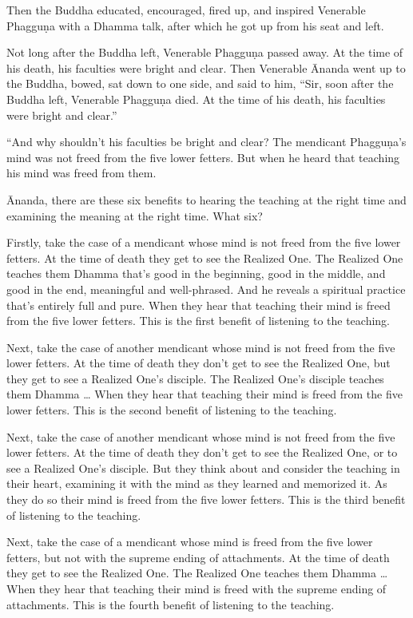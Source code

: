 \documentclass[12pt,openany]{book}%
\begin{document}
Then the Buddha educated, encouraged, fired up, and inspired Venerable \textsanskrit{Phagguṇa} with a Dhamma talk, after which he got up from his seat and left. 

Not long after the Buddha left, Venerable \textsanskrit{Phagguṇa} passed away. At the time of his death, his faculties were bright and clear. Then Venerable Ānanda went up to the Buddha, bowed, sat down to one side, and said to him, “Sir, soon after the Buddha left, Venerable \textsanskrit{Phagguṇa} died. At the time of his death, his faculties were bright and clear.” 

“And why shouldn’t his faculties be bright and clear? The mendicant \textsanskrit{Phagguṇa}’s mind was not freed from the five lower fetters. But when he heard that teaching his mind was freed from them. 

Ānanda, there are these six benefits to hearing the teaching at the right time and examining the meaning at the right time. What six? 

Firstly, take the case of a mendicant whose mind is not freed from the five lower fetters. At the time of death they get to see the Realized One. The Realized One teaches them Dhamma that’s good in the beginning, good in the middle, and good in the end, meaningful and well-phrased. And he reveals a spiritual practice that’s entirely full and pure. When they hear that teaching their mind is freed from the five lower fetters. This is the first benefit of listening to the teaching. 

Next, take the case of another mendicant whose mind is not freed from the five lower fetters. At the time of death they don’t get to see the Realized One, but they get to see a Realized One’s disciple. The Realized One’s disciple teaches them Dhamma … When they hear that teaching their mind is freed from the five lower fetters. This is the second benefit of listening to the teaching. 

Next, take the case of another mendicant whose mind is not freed from the five lower fetters. At the time of death they don’t get to see the Realized One, or to see a Realized One’s disciple. But they think about and consider the teaching in their heart, examining it with the mind as they learned and memorized it. As they do so their mind is freed from the five lower fetters. This is the third benefit of listening to the teaching. 

Next, take the case of a mendicant whose mind is freed from the five lower fetters, but not with the supreme ending of attachments. At the time of death they get to see the Realized One. The Realized One teaches them Dhamma … When they hear that teaching their mind is freed with the supreme ending of attachments. This is the fourth benefit of listening to the teaching. 
\end{document}
